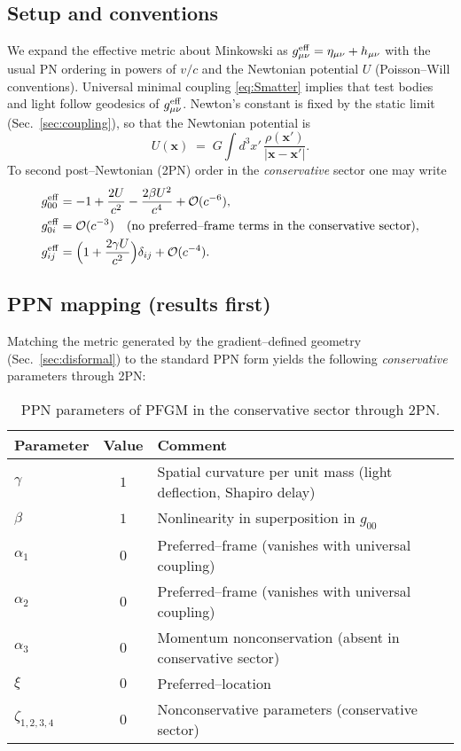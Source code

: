 \documentclass{article}
\begin{document}
\subsection{Setup and conventions}
We expand the effective metric about Minkowski as $g^{\rm eff}_{\mu\nu}=\eta_{\mu\nu}+h_{\mu\nu}$ with the usual PN ordering in powers of $v/c$ and the Newtonian potential $U$ (Poisson--Will conventions). Universal minimal coupling \eqref{eq:Smatter} implies that test bodies and light follow geodesics of $g^{\rm eff}_{\mu\nu}$. Newton’s constant is fixed by the static limit (Sec.~\ref{sec:coupling}), so that the Newtonian potential is
\begin{equation}
U(\mathbf{x}) \;=\; G \!\int \! d^3x' \, \frac{\rho(\mathbf{x}')}{|\mathbf{x}-\mathbf{x}'|}.
\end{equation}
To second post--Newtonian (2PN) order in the \emph{conservative} sector one may write
\begin{align}
g^{\rm eff}_{00} &= -1 + \frac{2U}{c^2} - \frac{2\beta U^2}{c^4} + \mathcal{O}(c^{-6}), \label{eq:PPN-g00}\\
g^{\rm eff}_{0i} &= \mathcal{O}(c^{-3}) \quad \text{(no preferred--frame terms in the conservative sector)}, \label{eq:PPN-g0i}\\
g^{\rm eff}_{ij} &= \Big(1 + \frac{2\gamma U}{c^2}\Big)\delta_{ij} + \mathcal{O}(c^{-4}). \label{eq:PPN-gij}
\end{align}

\subsection{PPN mapping (results first)}
\label{subsec:PPN-table}
Matching the metric generated by the gradient--defined geometry (Sec.~\ref{sec:disformal}) to the standard PPN form yields the following \emph{conservative} parameters through 2PN:
\begin{table}[h!]
\centering
\caption{PPN parameters of PFGM in the conservative sector through 2PN.}
\label{tab:PPN-map}
\begin{tabular}{lcl}
\hline\hline
Parameter & Value & Comment \\
\hline
$\gamma$   & $1$ & Spatial curvature per unit mass (light deflection, Shapiro delay) \\
$\beta$    & $1$ & Nonlinearity in superposition in $g_{00}$ \\
$\alpha_1$ & $0$ & Preferred--frame (vanishes with universal coupling) \\
$\alpha_2$ & $0$ & Preferred--frame (vanishes with universal coupling) \\
$\alpha_3$ & $0$ & Momentum nonconservation (absent in conservative sector) \\
$\xi$      & $0$ & Preferred--location \\
$\zeta_{1,2,3,4}$ & $0$ & Nonconservative parameters (conservative sector) \\
\hline\hline
\end{tabular}
\end{table}
\end{document}
